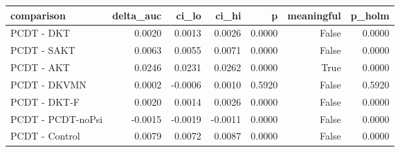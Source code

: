 \begin{tabular}{lrrrrrr}
\toprule
comparison & delta\_auc & ci\_lo & ci\_hi & p & meaningful & p\_holm \\
\midrule
PCDT - DKT & 0.0020 & 0.0013 & 0.0026 & 0.0000 & False & 0.0000 \\
PCDT - SAKT & 0.0063 & 0.0055 & 0.0071 & 0.0000 & False & 0.0000 \\
PCDT - AKT & 0.0246 & 0.0231 & 0.0262 & 0.0000 & True & 0.0000 \\
PCDT - DKVMN & 0.0002 & -0.0006 & 0.0010 & 0.5920 & False & 0.5920 \\
PCDT - DKT-F & 0.0020 & 0.0014 & 0.0026 & 0.0000 & False & 0.0000 \\
PCDT - PCDT-noPsi & -0.0015 & -0.0019 & -0.0011 & 0.0000 & False & 0.0000 \\
PCDT - Control & 0.0079 & 0.0072 & 0.0087 & 0.0000 & False & 0.0000 \\
\bottomrule
\end{tabular}
